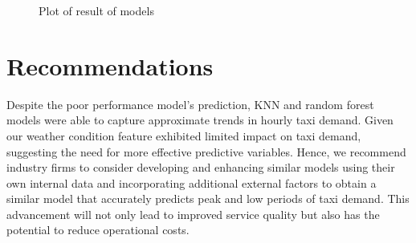 \documentclass[11pt]{article}
\begin{document}
\begin{figure}[h]
    \hspace{-3cm} %
    \hfill
    \hspace{-2cm} %
    \caption{Plot of result of models} %
\end{figure}


\section{Recommendations}
Despite the poor performance model’s prediction, KNN and random forest models were able to capture approximate trends in hourly taxi demand. Given our weather condition feature exhibited limited impact on taxi demand, suggesting the need for more effective predictive variables. Hence, we recommend industry firms to consider developing and enhancing similar models using their own internal data and incorporating additional external factors to obtain a similar model that accurately predicts peak and low periods of taxi demand. This advancement will not only lead to improved service quality but also has the potential to reduce operational costs.
\end{document}
